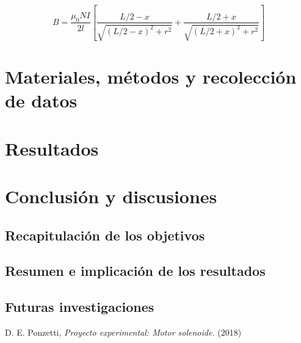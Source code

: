 \documentclass[a4paper,12pt]{article}
\begin{document}
        \begin{equation}
            \label{eq: campoMagneticoSolenoideFinito}
            B = \frac{\mu_0 N I}{2l} \left[ \frac{L/2 - x}{\sqrt{(L/2 - x)^2 + r^2}} + \frac{L/2 + x}{\sqrt{(L/2 + x)^2 + r^2}} \right]
        \end{equation}

\section*{Materiales, métodos y recolección de datos}

    

\section*{Resultados}

    

\section*{Conclusión y discusiones}

    \subsection*{Recapitulación de los objetivos}



    \subsection*{Resumen e implicación de los resultados}



    \subsection*{Futuras investigaciones}



\begin{thebibliography}{99}

    \bibitem{} D. E. Ponzetti, \emph{Proyecto experimental: Motor solenoide.} (2018)

\end{thebibliography}
\end{document}
